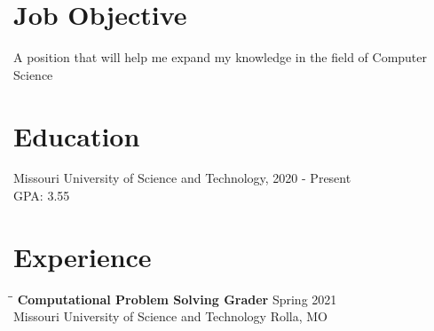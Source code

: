 \documentclass{res}
\begin{document}
 


\address{ rat23h@mst.edu - (636) 730-8032 - \textcolor{blue}{\underline{\href{https://github.com/Skrublaub/resume}{This Resume}}}}
                                  
\begin{resume}

\section{Job Objective}          
    A position that will help me expand my knowledge in the field
    of Computer Science
 
\section{Education}          
    Missouri University of Science and Technology, 2020 - Present\\        
    GPA: 3.55          

 
\section{Experience}
   \vspace{-0.1in}	
   \begin{tabbing}
   \hspace{2.3in}\= \hspace{2.6in}\= \kill %
    {\bf Computational Problem Solving Grader} \>  \>Spring 2021\\
    		Missouri University of Science and Technology\>\> Rolla, MO\\
                             

\end{tabbing}
\end{resume}
\end{document}
